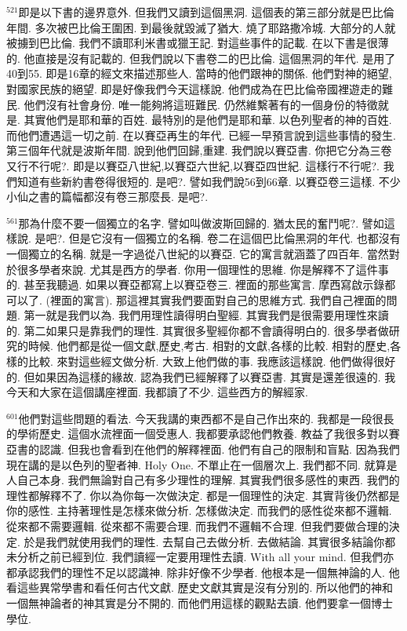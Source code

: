 \documentclass{book}
\begin{document}
$^{521}$即是以下書的邊界意外.
但我們又讀到這個黑洞.
這個表的第三部分就是巴比倫年間.
多次被巴比倫王圍困.
到最後就毀滅了猶大.
燒了耶路撒冷城.
大部分的人就被擄到巴比倫.
我們不讀耶利米書或獵王記.
對這些事件的記載.
在以下書是很薄的.
他直接是沒有記載的.
但我們說以下書卷二的巴比倫.
這個黑洞的年代.
是用了40到55.
即是16章的經文來描述那些人.
當時的他們跟神的關係.
他們對神的絕望,對國家民族的絕望.
即是好像我們今天這樣說.
他們成為在巴比倫帝國裡遊走的難民.
他們沒有社會身份.
唯一能夠將這班難民.
仍然維繫著有的一個身份的特徵就是.
其實他們是耶和華的百姓.
最特別的是他們是耶和華.
以色列聖者的神的百姓.
而他們遭遇這一切之前.
在以賽亞再生的年代.
已經一早預言說到這些事情的發生.
第三個年代就是波斯年間.
說到他們回歸,重建.
我們說以賽亞書.
你把它分為三卷又行不行呢?.
即是以賽亞八世紀,以賽亞六世紀,以賽亞四世紀.
這樣行不行呢?.
我們知道有些新約書卷得很短的.
是吧?.
譬如我們說56到66章.
以賽亞卷三這樣.
不少小仙之書的篇幅都沒有卷三那麼長.
是吧?.

$^{561}$那為什麼不要一個獨立的名字.
譬如叫做波斯回歸的.
猶太民的奮鬥呢?.
譬如這樣說.
是吧?.
但是它沒有一個獨立的名稱.
卷二在這個巴比倫黑洞的年代.
也都沒有一個獨立的名稱.
就是一字過從八世紀的以賽亞.
它的寓言就涵蓋了四百年.
當然對於很多學者來說.
尤其是西方的學者.
你用一個理性的思維.
你是解釋不了這件事的.
甚至我聽過.
如果以賽亞都寫上以賽亞卷三.
裡面的那些寓言.
摩西寫啟示錄都可以了.
(裡面的寓言).
那這裡其實我們要面對自己的思維方式.
我們自己裡面的問題.
第一就是我們以為.
我們用理性讀得明白聖經.
其實我們是很需要用理性來讀的.
第二如果只是靠我們的理性.
其實很多聖經你都不會讀得明白的.
很多學者做研究的時候.
他們都是從一個文獻,歷史,考古.
相對的文獻,各樣的比較.
相對的歷史,各樣的比較.
來對這些經文做分析.
大致上他們做的事.
我應該這樣說.
他們做得很好的.
但如果因為這樣的緣故.
認為我們已經解釋了以賽亞書.
其實是還差很遠的.
我今天和大家在這個講座裡面.
我都讀了不少.
這些西方的解經家.

$^{601}$他們對這些問題的看法.
今天我講的東西都不是自己作出來的.
我都是一段很長的學術歷史.
這個水流裡面一個受惠人.
我都要承認他們教養.
教益了我很多對以賽亞書的認識.
但我也會看到在他們的解釋裡面.
他們有自己的限制和盲點.
因為我們現在講的是以色列的聖者神.
Holy One.
不單止在一個層次上.
我們都不同.
就算是人自己本身.
我們無論對自己有多少理性的理解.
其實我們很多感性的東西.
我們的理性都解釋不了.
你以為你每一次做決定.
都是一個理性的決定.
其實背後仍然都是你的感性.
主持著理性是怎樣來做分析.
怎樣做決定.
而我們的感性從來都不邏輯.
從來都不需要邏輯.
從來都不需要合理.
而我們不邏輯不合理.
但我們要做合理的決定.
於是我們就使用我們的理性.
去幫自己去做分析.
去做結論.
其實很多結論你都未分析之前已經到位.
我們讀經一定要用理性去讀.
With all your mind.
但我們亦都承認我們的理性不足以認識神.
除非好像不少學者.
他根本是一個無神論的人.
他看這些異常學書和看任何古代文獻.
歷史文獻其實是沒有分別的.
所以他們的神和一個無神論者的神其實是分不開的.
而他們用這樣的觀點去讀.
他們要拿一個博士學位.
\end{document}
